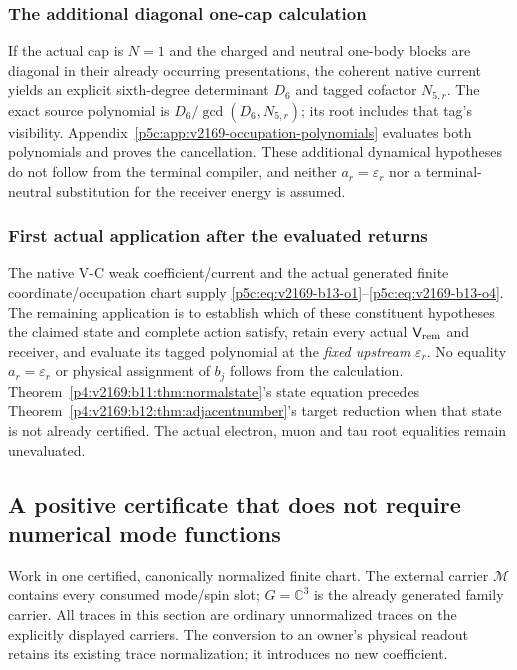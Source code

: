 \documentclass[12pt,a4paper]{article}
\begin{document}
\subsubsection{The additional diagonal one-cap calculation}
If the actual cap is $N=1$ and the charged and neutral one-body blocks
are diagonal in their already occurring presentations, the coherent native
current yields an explicit sixth-degree determinant $D_6$ and tagged cofactor
$N_{5,r}$. The exact source polynomial is
$D_6/\gcd(D_6,N_{5,r})$; its root includes that tag's visibility.
Appendix~\ref{p5c:app:v2169-occupation-polynomials} evaluates both polynomials
and proves the cancellation. These additional dynamical hypotheses do not
follow from the terminal compiler, and neither $a_r=\varepsilon_r$ nor a
terminal-neutral substitution for the receiver energy is assumed.

\subsubsection{First actual application after the evaluated returns}
The native V-C weak coefficient/current and the actual generated finite
coordinate/occupation chart supply \eqref{p5c:eq:v2169-b13-o1}--\eqref{p5c:eq:v2169-b13-o4}. The remaining application is
to establish which of these constituent hypotheses the claimed state and
complete action satisfy, retain every actual $\mathsf V_{\rm rem}$ and
receiver, and evaluate its tagged polynomial at the \emph{fixed upstream}
$\varepsilon_r$. No equality $a_r=\varepsilon_r$ or physical assignment of
$b_j$ follows from the calculation. Theorem~\ref{p4:v2169:b11:thm:normalstate}'s state equation precedes
Theorem~\ref{p4:v2169:b12:thm:adjacentnumber}'s target reduction when that state is not already certified.
The actual electron, muon and tau root equalities remain unevaluated.





\subsection{A positive certificate that does not require numerical mode functions}
Work in one certified, canonically normalized finite chart. The external
carrier $\mathcal M$ contains every consumed mode/spin slot; $G=\mathbb C^3$
is the already generated family carrier. All traces in this section are
ordinary unnormalized traces on the explicitly displayed carriers.
The conversion to an owner's physical readout retains its existing trace
normalization; it introduces no new coefficient.
\end{document}
